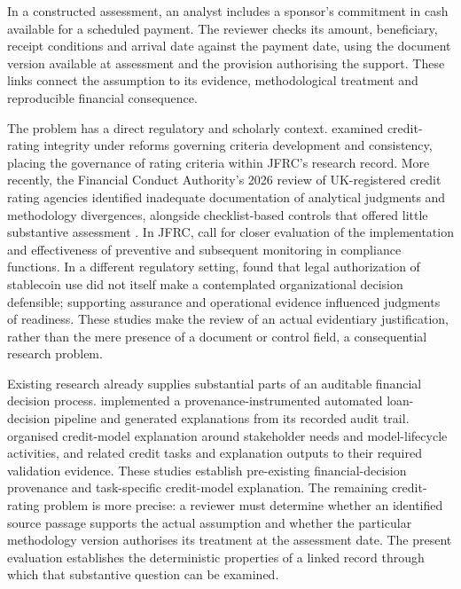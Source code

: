 \documentclass[11pt,a4paper]{article}
\begin{document}
In a constructed assessment, an analyst includes a sponsor's commitment in cash available for a scheduled payment. The reviewer checks its amount, beneficiary, receipt conditions and arrival date against the payment date, using the document version available at assessment and the provision authorising the support. These links connect the assumption to its evidence, methodological treatment and reproducible financial consequence.

The problem has a direct regulatory and scholarly context. \citet{adelson2015} examined credit-rating integrity under reforms governing criteria development and consistency, placing the governance of rating criteria within JFRC's research record. More recently, the Financial Conduct Authority's 2026 review of UK-registered credit rating agencies identified inadequate documentation of analytical judgments and methodology divergences, alongside checklist-based controls that offered little substantive assessment \citep{fca2026}. In JFRC, \citet{castro2026} call for closer evaluation of the implementation and effectiveness of preventive and subsequent monitoring in compliance functions. In a different regulatory setting, \citet{aria2026} found that legal authorization of stablecoin use did not itself make a contemplated organizational decision defensible; supporting assurance and operational evidence influenced judgments of readiness. These studies make the review of an actual evidentiary justification, rather than the mere presence of a document or control field, a consequential research problem.

Existing research already supplies substantial parts of an auditable financial decision process. \citet{huynh2021} implemented a provenance-instrumented automated loan-decision pipeline and generated explanations from its recorded audit trail. \citet{bucker2022} organised credit-model explanation around stakeholder needs and model-lifecycle activities, and \citet{xie2026} related credit tasks and explanation outputs to their required validation evidence. These studies establish pre-existing financial-decision provenance and task-specific credit-model explanation. The remaining credit-rating problem is more precise: a reviewer must determine whether an identified source passage supports the actual assumption and whether the particular methodology version authorises its treatment at the assessment date. The present evaluation establishes the deterministic properties of a linked record through which that substantive question can be examined.
\end{document}
